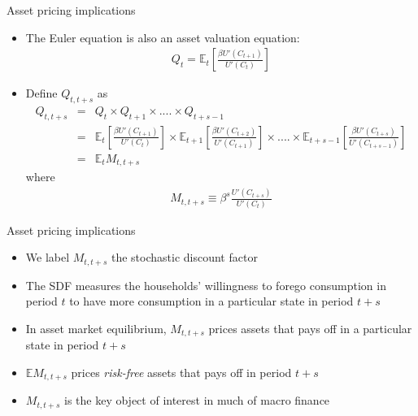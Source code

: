 \documentclass[9pt,xcolor={dvipsnames}]{beamer}
\newcommand{\bit}{\begin{itemize}}
\newcommand{\eit}{\end{itemize}}
\newcommand{\bc}{\color{blue}}
\begin{document}
\begin{frame}{Asset pricing implications}

\bit
\setlength\itemsep{1.5em}

\item The Euler equation is also an asset valuation equation:
\begin{eqnarray}
Q_t = \mathbb E_t \left[\frac{\beta U'(C_{t+1}) }{U'(C_{t}) }\right] \nonumber
\end{eqnarray}

\item Define $Q_{t,t+s}$ as 
\begin{eqnarray}
Q_{t, t+s} &=& Q_t \times Q_{t+1} \times  .... \times Q_{t+s-1} \nonumber\\
 &=& \mathbb E_t \left[\frac{\beta U'(C_{t+1}) }{U'(C_{t}) }\right] \times \mathbb E_{t+1} \left[\frac{\beta U'(C_{t+2}) }{U'(C_{t+1}) }\right] \times  .... \times \mathbb  E_{t+s-1} \left[\frac{\beta U'(C_{t+s}) }{U'(C_{t+s-1}) }\right] \nonumber\\
&=& \mathbb E_t M_{t,t+s} \nonumber
\end{eqnarray}
where 
\begin{eqnarray}
M_{t,t+s}\equiv \beta^s\frac{U'(C_{t+s}) }{U'(C_{t})} \nonumber
\end{eqnarray}

\eit

\end{frame}


\begin{frame}{Asset pricing implications}

\bit
\setlength\itemsep{1.5em}

\item We label $M_{t,t+s}$ the {\bc stochastic discount factor}

\item The SDF measures the households' willingness to forego consumption in period $t$ to have more consumption in a particular state in period $t+s$

\item In asset market equilibrium, $M_{t,t+s}$ prices assets that pays off in a particular state in period $t+s$

\item $\mathbb E M_{t,t+s}$ prices \emph{risk-free} assets that pays off in period $t+s$

\item $M_{t,t+s}$ is the key object of interest in much of {\bc macro finance}

\eit

\end{frame}
\end{document}
